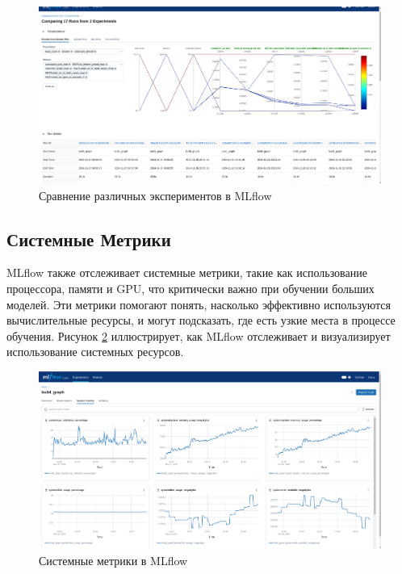 \documentclass[14pt, a4paper]{bsu}
\begin{document}
\begin{figure}[h!] \centering
	\includegraphics[width=1.0\textwidth]{mlflow_comparision_of_experiments.png}
	\caption{Сравнение различных экспериментов в MLflow}
	\label{fig:mlflow_comparison} \end{figure}

\subsection{Системные Метрики}

MLflow также отслеживает системные метрики, такие как использование
процессора, памяти и GPU, что критически важно при обучении больших
моделей. Эти метрики помогают понять, насколько эффективно
используются вычислительные ресурсы, и могут подсказать, где есть
узкие места в процессе обучения. Рисунок
\ref{fig:mlflow_system_metrics} иллюстрирует, как MLflow
отслеживает и визуализирует использование системных ресурсов.

\begin{figure}[h!] \centering
	\includegraphics[width=1.0\textwidth]{mlflow_system_metrics_example.png}
	\caption{Системные метрики в MLflow}
	\label{fig:mlflow_system_metrics} \end{figure}
\end{document}
